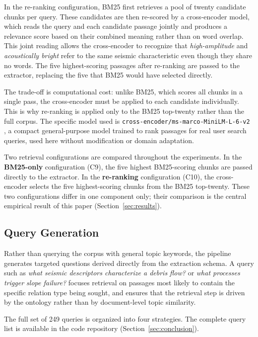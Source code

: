 \documentclass[10pt]{article}
\begin{document}
In the re-ranking configuration, BM25 first retrieves a
pool of twenty candidate chunks per query.
These candidates are then re-scored by a cross-encoder
model, which reads the query and each candidate passage
jointly and produces a relevance score based on their
combined meaning rather than on word overlap.
This joint reading allows the cross-encoder to recognize
that \emph{high-amplitude} and \emph{acoustically bright}
refer to the same seismic characteristic even though they
share no words.
The five highest-scoring passages after re-ranking are
passed to the extractor, replacing the five that BM25 would
have selected directly.

The trade-off is computational cost: unlike BM25, which
scores all chunks in a single pass, the cross-encoder must
be applied to each candidate individually.
This is why re-ranking is applied only to the BM25
top-twenty rather than the full corpus.
The specific model used is
\texttt{cross-encoder/ms-marco-MiniLM-L-6-v2}
\citep{bajaj2016ms}, a compact general-purpose model trained
to rank passages for real user search queries, used here
without modification or domain adaptation.

Two retrieval configurations are compared throughout the
experiments.
In the \textbf{BM25-only} configuration (C9), the five
highest BM25-scoring chunks are passed directly to the
extractor.
In the \textbf{re-ranking} configuration (C10), the
cross-encoder selects the five highest-scoring chunks from
the BM25 top-twenty.
These two configurations differ in one component only;
their comparison is the central empirical result of this
paper (Section~\ref{sec:results}).

\subsection{Query Generation}
\label{sec:queries}

Rather than querying the corpus with general topic keywords,
the pipeline generates targeted questions derived directly
from the extraction schema.
A query such as \emph{what seismic descriptors characterize
a debris flow?} or \emph{what processes trigger slope
failure?} focuses retrieval on passages most likely to
contain the specific relation type being sought, and ensures
that the retrieval step is driven by the ontology rather than
by document-level topic similarity.

The full set of 249 queries is organized into four
strategies.
The complete query list is available in the code repository
(Section~\ref{sec:conclusion}).
\end{document}
